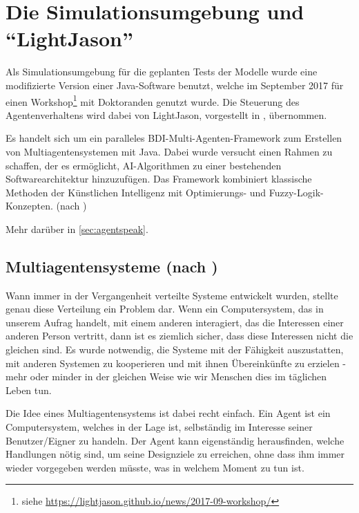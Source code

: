 \section{Die Simulationsumgebung und \enquote{LightJason}}
\label{sec:simulationsumgebung}

Als Simulationsumgebung für die geplanten Tests der Modelle wurde eine modifizierte Version einer Java-Software benutzt, welche im September 2017 für einen Workshop\footnote{siehe \url{https://lightjason.github.io/news/2017-09-workshop/}} mit Doktoranden genutzt wurde.
Die Steuerung des Agentenverhaltens wird dabei von LightJason, vorgestellt in \cite{lightjason}, übernommen.

Es handelt sich um ein paralleles BDI-Multi-Agenten-Framework zum Erstellen von Multiagentensystemen mit Java. 
Dabei wurde versucht einen Rahmen zu schaffen, der es ermöglicht, AI-Algorithmen zu einer bestehenden Softwarearchitektur hinzuzufügen. 
Das Framework kombiniert klassische Methoden der Künstlichen Intelligenz mit Optimierungs- und Fuzzy-Logik-Konzepten.
(nach \cite{lightjason-web})

Mehr darüber in \cref{sec:agentspeak}.

\subsection[Multiagentensysteme]{Multiagentensysteme (nach \cite{multiagent})}
\label{sec:multiagentensysteme}

Wann immer in der Vergangenheit verteilte Systeme entwickelt wurden, stellte genau diese Verteilung ein Problem dar. 
Wenn ein Computersystem, das in unserem Aufrag handelt, mit einem anderen interagiert, das die Interessen einer anderen Person vertritt, dann ist es ziemlich sicher, dass diese Interessen nicht die gleichen sind.
Es wurde notwendig, die Systeme mit der Fähigkeit auszustatten, mit anderen Systemen zu kooperieren und mit ihnen Übereinkünfte zu erzielen - mehr oder minder in der gleichen Weise wie wir Menschen dies im täglichen Leben tun.

Die Idee eines Multiagentensystems ist dabei recht einfach.
Ein Agent ist ein Computersystem, welches in der Lage ist, selbständig im Interesse seiner Benutzer/Eigner zu handeln.
Der Agent kann eigenständig herausfinden, welche Handlungen nötig sind, um seine Designziele zu erreichen, ohne dass ihm immer wieder vorgegeben werden müsste, was in welchem Moment zu tun ist.

